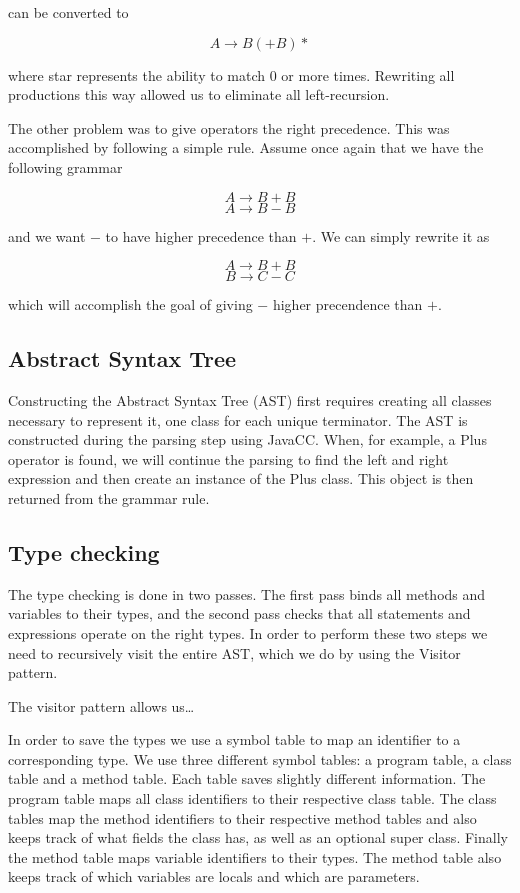 \documentclass[a4paper]{article}
\begin{document}
can be converted to

$$A \rightarrow B (+ B)*$$

where star represents the ability to match $0$ or more times. Rewriting all
productions this way allowed us to eliminate all left-recursion.

The other problem was to give operators the right precedence. This was
accomplished by following a simple rule. Assume once again that we have the
following grammar

$$A \rightarrow B + B$$
$$A \rightarrow B - B$$

and we want $-$ to have higher precedence than $+$. We can simply rewrite it as

$$A \rightarrow B + B$$
$$B \rightarrow C - C$$

which will accomplish the goal of giving $-$ higher precendence than $+$.

\subsection{Abstract Syntax Tree}

Constructing the Abstract Syntax Tree (AST) first requires creating all classes
necessary to represent it, one class for each unique terminator. The AST is
constructed during the parsing step using JavaCC. When, for example, a Plus
operator is found, we will continue the parsing to find the left and right
expression and then create an instance of the Plus class. This object is then
returned from the grammar rule.

\subsection{Type checking}

The type checking is done in two passes. The first pass binds all methods and
variables to their types, and the second pass checks that all statements and
expressions operate on the right types. In order to perform these two steps we
need to recursively visit the entire AST, which we do by using the Visitor
pattern.

The visitor pattern allows us\ldots

In order to save the types we use a symbol table to map an identifier to a
corresponding type. We use three different symbol tables: a program table, a
class table and a method table. Each table saves slightly different information.
The program table maps all class identifiers to their respective class table.
The class tables map the method identifiers to their respective method tables
and also keeps track of what fields the class has, as well as an optional super
class. Finally the method table maps variable identifiers to their types. The
method table also keeps track of which variables are locals and which are
parameters.
\end{document}
